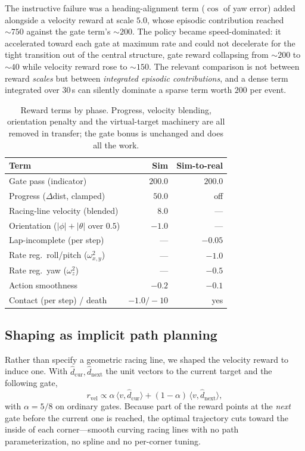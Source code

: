 \documentclass[10pt, twocolumn]{article}
\begin{document}
The instructive failure was a heading-alignment term ($\cos$ of yaw error)
added alongside a velocity reward at scale $5.0$, whose episodic contribution
reached ${\sim}750$ against the gate term's ${\sim}200$. The policy became
speed-dominated: it accelerated toward each gate at maximum rate and could not
decelerate for the tight transition out of the central structure, gate reward
collapsing from ${\sim}200$ to ${\sim}40$ while velocity reward rose to
${\sim}150$. The relevant comparison is not between reward \emph{scales} but
between \emph{integrated episodic contributions}, and a dense term integrated
over $30$\,s can silently dominate a sparse term worth $200$ per event.

\begin{table}[t]
\centering
\footnotesize
\caption{Reward terms by phase. Progress, velocity blending, orientation
penalty and the virtual-target machinery are all removed in transfer; the gate
bonus is unchanged and does all the work.}
\label{tab:reward}
\begin{tabular}{@{}l r r@{}}
\toprule
Term & Sim & Sim-to-real \\
\midrule
Gate pass (indicator)          & $200.0$ & $200.0$ \\
Progress ($\Delta$dist, clamped) & $50.0$  & off \\
Racing-line velocity (blended) & $8.0$   & --- \\
Orientation ($|\phi|+|\theta|$ over $0.5$)  & $-1.0$  & --- \\
Lap-incomplete (per step)      & ---     & $-0.05$ \\
Rate reg.\ roll/pitch ($\omega_{x,y}^2$) & --- & $-1.0$ \\
Rate reg.\ yaw ($\omega_z^2$)  & ---     & $-0.5$ \\
Action smoothness              & $-0.2$  & $-0.1$ \\
Contact (per step) / death     & $-1.0/-10$ & yes \\
\bottomrule
\end{tabular}
\end{table}

\subsection{Shaping as implicit path planning}

Rather than specify a geometric racing line, we shaped the velocity reward to
induce one. With $\hat{d}_{\text{cur}}, \hat{d}_{\text{next}}$ the unit vectors
to the current target and the following gate,
\begin{equation}
r_{\text{vel}} \propto
\alpha \, \langle v, \hat{d}_{\text{cur}} \rangle +
(1-\alpha) \, \langle v, \hat{d}_{\text{next}} \rangle ,
\end{equation}
with $\alpha = 5/8$ on ordinary gates. Because part of the reward points at the
\emph{next} gate before the current one is reached, the optimal trajectory cuts
toward the inside of each corner---smooth curving racing lines with no path
parameterization, no spline and no per-corner tuning.
\end{document}
